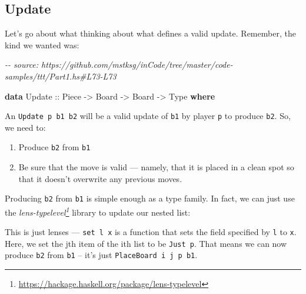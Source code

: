 \documentclass[]{article}
\newenvironment{Shaded}{}{}
\newcommand{\CommentTok}[1]{\textcolor[rgb]{0.38,0.63,0.69}{\textit{#1}}}
\newcommand{\DataTypeTok}[1]{\textcolor[rgb]{0.56,0.13,0.00}{#1}}
\newcommand{\KeywordTok}[1]{\textcolor[rgb]{0.00,0.44,0.13}{\textbf{#1}}}
\newcommand{\NormalTok}[1]{#1}
\newcommand{\OperatorTok}[1]{\textcolor[rgb]{0.40,0.40,0.40}{#1}}
\newcommand{\OtherTok}[1]{\textcolor[rgb]{0.00,0.44,0.13}{#1}}
\renewcommand{\href}[2]{#2\footnote{\url{#1}}}
\begin{document}
\hypertarget{update}{%
\subsection{Update}\label{update}}

Let's go about what thinking about what defines a valid update. Remember, the
kind we wanted was:

\begin{Shaded}
\begin{Highlighting}[]
\CommentTok{{-}{-} source: https://github.com/mstksg/inCode/tree/master/code{-}samples/ttt/Part1.hs\#L73{-}L73}

\KeywordTok{data} \DataTypeTok{Update}\OtherTok{ ::} \DataTypeTok{Piece} \OtherTok{{-}>} \DataTypeTok{Board} \OtherTok{{-}>} \DataTypeTok{Board} \OtherTok{{-}>} \DataTypeTok{Type} \KeywordTok{where}
\end{Highlighting}
\end{Shaded}

An \texttt{Update\ p\ b1\ b2} will be a valid update of \texttt{b1} by player
\texttt{p} to produce \texttt{b2}. So, we need to:

\begin{enumerate}
\def\labelenumi{\arabic{enumi}.}
\tightlist
\item
  Produce \texttt{b2} from \texttt{b1}
\item
  Be sure that the move is valid --- namely, that it is placed in a clean spot
  so that it doesn't overwrite any previous moves.
\end{enumerate}

Producing \texttt{b2} from \texttt{b1} is simple enough as a type family. In
fact, we can just use the
\emph{\href{https://hackage.haskell.org/package/lens-typelevel}{lens-typelevel}}
library to update our nested list:

\begin{Shaded}
\end{Shaded}

This is just lenses --- \texttt{set\ l\ x} is a function that sets the field
specified by \texttt{l} to \texttt{x}. Here, we set the jth item of the ith list
to be \texttt{Just\ p}. That means we can now produce \texttt{b2} from
\texttt{b1} -- it's just \texttt{PlaceBoard\ i\ j\ p\ b1}.
\end{document}
